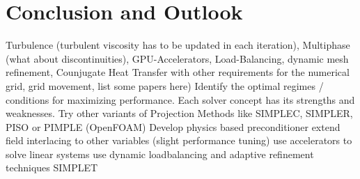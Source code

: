 \section{Conclusion and Outlook}
Turbulence (turbulent viscosity has to be updated in each iteration), Multiphase (what about discontinuities), GPU-Accelerators, Load-Balancing, dynamic mesh refinement, Counjugate Heat Transfer with other requirements for the numerical grid, grid movement, list some papers here)
Identify the optimal regimes / conditions for maximizing performance. Each solver concept has its strengths and weaknesses.
Try other variants of Projection Methods like SIMPLEC, SIMPLER, PISO or PIMPLE (OpenFOAM)
Develop physics based preconditioner
extend field interlacing to other variables (slight performance tuning)
use accelerators to solve linear systems
use dynamic loadbalancing and adaptive refinement techniques
SIMPLET


